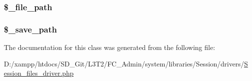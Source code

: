 \subsubsection[{\$\+\_\+file\+\_\+path}]{\setlength{\rightskip}{0pt plus 5cm}\$\+\_\+file\+\_\+path\hspace{0.3cm}{\ttfamily [protected]}}\label{class_c_i___session__files__driver_af2a67abb59f4c991dd98452ec6e6dcc7}
\hypertarget{class_c_i___session__files__driver_a6435cefa01b850e041ae9066224e8a4d}{}
\subsubsection[{\$\+\_\+save\+\_\+path}]{\setlength{\rightskip}{0pt plus 5cm}\$\+\_\+save\+\_\+path\hspace{0.3cm}{\ttfamily [protected]}}\label{class_c_i___session__files__driver_a6435cefa01b850e041ae9066224e8a4d}


The documentation for this class was generated from the following file\+:\begin{DoxyCompactItemize}
\item 
D\+:/xampp/htdocs/\+S\+D\+\_\+\+Git/\+L3\+T2/\+F\+C\+\_\+\+Admin/system/libraries/\+Session/drivers/\hyperlink{_session__files__driver_8php}{Session\+\_\+files\+\_\+driver.\+php}\end{DoxyCompactItemize}
